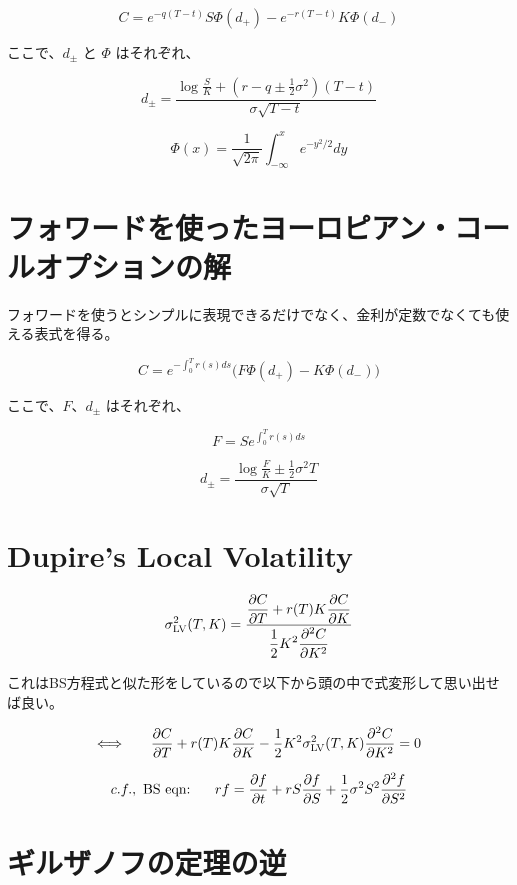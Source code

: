 \documentclass[uplatex]{jsarticle}
\begin{document}
\[
	C = e^{-q(T-t)} S \Phi(d_{+}) - e^{-r(T-t)} K \Phi(d_{-})
\]

ここで、$d_{\pm}$ と $\Phi$ はそれぞれ、

\[
	d_{\pm} = \frac{ \displaystyle \log \frac{S}{K} + (r-q \pm \frac{1}{2} \sigma^{2} ) (T-t) }{ \sigma \sqrt{ T - t } }
\]

\[
	\Phi(x) = \frac{1}{ \sqrt{2 \pi} } \int^{x}_{- \infty} e^{-y^{2}/2} dy
\]


\section{フォワードを使ったヨーロピアン・コールオプションの解}

フォワードを使うとシンプルに表現できるだけでなく、金利が定数でなくても使える表式を得る。

\[
	C = e^{-\int^{T}_{0} r(s) ds} \Big( F \Phi(d_{+}) - K \Phi(d_{-}) \Big)
\]

ここで、$F$、$d_{\pm}$ はそれぞれ、

\[
	F = S e^{\int^{T}_{0} r(s) ds }
\]

\[
	d_{\pm} = \frac{ \displaystyle \log \frac{F}{K} \pm \frac{1}{2} \sigma^{2} T }{ \sigma \sqrt{ T } }
\]

\section{Dupire's Local Volatility}

\[
	\sigma_{\rm LV}^{2}(T,K)
	=
	\frac{
		\displaystyle
		\frac{\partial C}{\partial T} + r(T) K \frac{\partial C}{\partial K}
	}{
		\displaystyle
		\frac{1}{2} K^{2}
		\frac{\partial^{2} C}{\partial K^{2}}
	}
\]

これはBS方程式と似た形をしているので以下から頭の中で式変形して思い出せば良い。

\[
	\Longleftrightarrow
	\ \hspace{5mm}
	\frac{\partial C}{\partial T} + r(T) K \frac{\partial C}{\partial K}
	-
	\frac{1}{2} K^{2}
	\sigma_{\rm LV}^{2}(T,K)
	\frac{\partial^{2} C}{\partial K^{2}}
	=0
\]

\[
	c.f., \
	\text{BS eqn:}
	\ \hspace{5mm}
	rf
	=
	\frac{\partial f}{\partial t}
	+
	r S \frac{\partial f}{\partial S}
	+
	\frac{1}{2} \sigma^{2} S^{2}
	\frac{\partial^{2} f}{\partial S^{2}}
\]



\section{ギルザノフの定理の逆}
\end{document}
